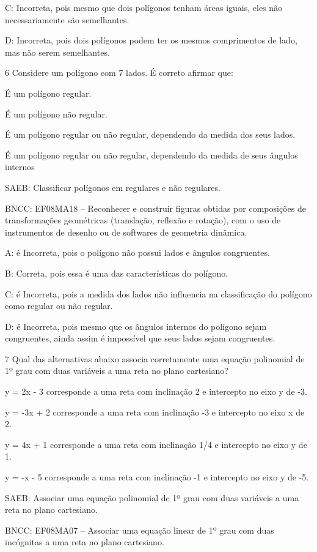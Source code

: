 {C: Incorreta, pois mesmo que dois polígonos tenham áreas iguais, eles
não necessariamente são semelhantes.

D: Incorreta, pois dois polígonos podem ter os mesmos comprimentos de
lado, mas não serem semelhantes.

\num{6} Considere um polígono com 7 lados. É correto afirmar que:
\item É um polígono regular.
\item É um polígono não regular.
\item É um polígono regular ou não regular, dependendo da medida dos seus
lados.
\item É um polígono regular ou não regular, dependendo da medida de seus
ângulos internos

SAEB: Classificar polígonos em regulares e não regulares.

BNCC: EF08MA18 -- Reconhecer e construir figuras obtidas por composições
de transformações geométricas (translação, reflexão e rotação), com o
uso de instrumentos de desenho ou de softwares de geometria dinâmica.

A: é Incorreta, pois o polígono não possui lados e ângulos congruentes.

B: Correta, pois essa é uma das características do polígono.

C: é Incorreta, pois a medida dos lados não influencia na classificação
do polígono como regular ou não regular.

D: é Incorreta, pois mesmo que os ângulos internos do polígono sejam
congruentes, ainda assim é impossível que seus lados sejam congruentes.

\num{7} Qual das alternativas abaixo associa corretamente uma equação
polinomial de 1º grau com duas variáveis a uma reta no plano cartesiano?
\item y = 2x - 3 corresponde a uma reta com inclinação 2 e intercepto no
eixo y de -3.
\item y = -3x + 2 corresponde a uma reta com inclinação -3 e intercepto no
eixo x de 2.
\item y = 4x + 1 corresponde a uma reta com inclinação 1/4 e intercepto no
eixo y de 1.
\item y = -x - 5 corresponde a uma reta com inclinação -1 e intercepto no
eixo y de -5.

SAEB: Associar uma equação polinomial de 1º grau com duas variáveis a
uma reta no plano cartesiano.

BNCC: EF08MA07 -- Associar uma equação linear de 1º grau com duas
incógnitas a uma reta no plano cartesiano.

}
